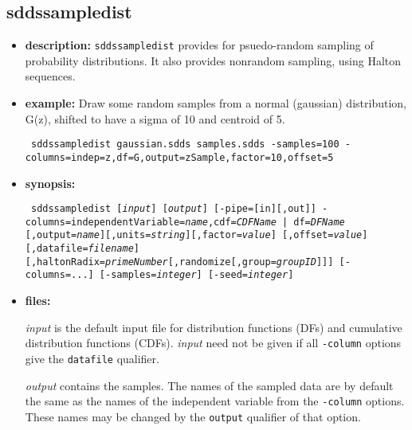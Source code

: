 \begin{latexonly}
\newpage
\end{latexonly}
\subsection{sddssampledist}
\label{sddssampledist}

\begin{itemize}
\item {\bf description:}
{\tt sddssampledist} provides for psuedo-random sampling of probability
distributions.  It also provides nonrandom sampling, using Halton sequences.

\item {\bf example:} 
Draw some random samples from a normal (gaussian) distribution, G(z), shifted to have
a sigma of 10 and centroid of 5.
\begin{flushleft}{\tt
sddssampledist gaussian.sdds samples.sdds -samples=100 -columns=indep=z,df=G,output=zSample,factor=10,offset=5
}\end{flushleft}

\item {\bf synopsis:} 
\begin{flushleft}{\tt
sddssampledist [{\em input}] [{\em output}] [-pipe=[in][,out]]
-columns=independentVariable={\em name},{cdf={\em CDFName} | df={\em DFName}}
   [,output={\em name}][,units={\em string}][,factor={\em value}]
   [,offset={\em value}][,datafile={\em filename}]
   [,haltonRadix={\em primeNumber}[,randomize[,group={\em groupID}]]]
[-columns=...] [-samples={\em integer}] [-seed={\em integer}]
}\end{flushleft}

\item {\bf files:}

{\em input} is the default input file for distribution functions (DFs)
and cumulative distribution functions (CDFs).  {\em input} need not be
given if all {\tt -column} options give the {\tt datafile} qualifier.

{\em output} contains the samples.  The names of the sampled data are
by default the same as the names of the independent variable from the
{\tt -column} options.  These names may be changed by the {\tt output}
qualifier of that option.


\end{itemize}
